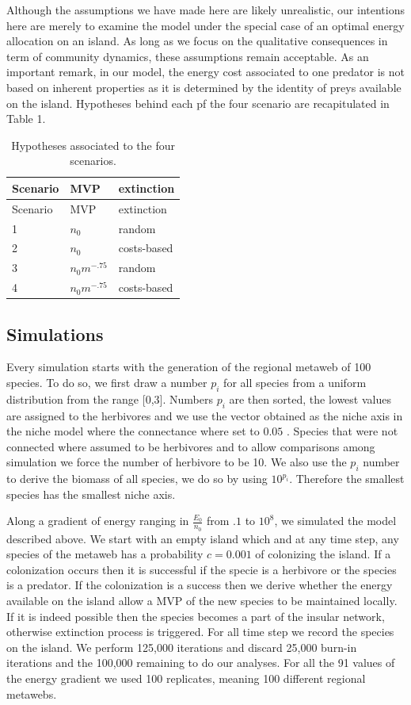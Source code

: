 Although the assumptions we have made here are likely unrealistic, our
intentions here are merely to examine the model under the special case
of an optimal energy allocation on an island. As long as we focus on the
qualitative consequences in term of community dynamics, these
assumptions remain acceptable. As an important remark, in our model, the
energy cost associated to one predator is not based on inherent
properties as it is determined by the identity of preys available on the
island. Hypotheses behind each pf the four scenario are recapitulated in
Table 1.

\begin{longtable}[]{@{}lll@{}}
\caption{Hypotheses associated to the four scenarios.}\tabularnewline
\toprule
Scenario & MVP & extinction\tabularnewline
\midrule
\endfirsthead
\toprule
Scenario & MVP & extinction\tabularnewline
\midrule
\endhead
1 & \(n_0\) & random\tabularnewline
2 & \(n_0\) & costs-based\tabularnewline
3 & \(n_0m^{-.75}\) & random\tabularnewline
4 & \(n_0m^{-.75}\) & costs-based\tabularnewline
\bottomrule
\end{longtable}

\subsection{Simulations}\label{simulations}

Every simulation starts with the generation of the regional metaweb of
100 species. To do so, we first draw a number \(p_i\) for all species
from a uniform distribution from the range {[}0,3{]}. Numbers \(p_i\)
are then sorted, the lowest values are assigned to the herbivores and we
use the vector obtained as the niche axis in the niche model where the
connectance where set to \(0.05\) \citep{William2000}. Species that were
not connected where assumed to be herbivores and to allow comparisons
among simulation we force the number of herbivore to be 10. We also use
the \(p_i\) number to derive the biomass of all species, we do so by
using \(10^{p_i}\). Therefore the smallest species has the smallest
niche axis.

Along a gradient of energy ranging in \(\frac{E_0}{n_0}\) from \(.1\) to
\(10^8\), we simulated the model described above. We start with an empty
island which and at any time step, any species of the metaweb has a
probability \(c=0.001\) of colonizing the island. If a colonization
occurs then it is successful if the specie is a herbivore or the species
is a predator. If the colonization is a success then we derive whether
the energy available on the island allow a MVP of the new species to be
maintained locally. If it is indeed possible then the species becomes a
part of the insular network, otherwise extinction process is triggered.
For all time step we record the species on the island. We perform
125,000 iterations and discard 25,000 burn-in iterations and the 100,000
remaining to do our analyses. For all the 91 values of the energy
gradient we used 100 replicates, meaning 100 different regional
metawebs.

